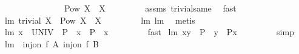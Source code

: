 \begin{isabellebody}
\ \ \ \ \ \ \ \ \ \ \ \ \ \ \ {\isachardoublequoteopen}{\isacharparenleft}Pow\ X\ {\isasymsubseteq}\ {\isacharbraceleft}{\isacharbraceleft}{\isacharbraceright}{\isacharcomma}X{\isacharbraceright}{\isacharparenright}{\isachardoublequoteclose}\ \isanewline
%
\isadelimproof
\ \ \ \ \ \ %
\endisadelimproof
%
\isatagproof
{}\isamarkupfalse%
\ assms\ trivial{\isacharunderscore}same\ \isamarkupfalse%
\ fast%
\endisatagproof
{\isafoldproof}%
%
\isadelimproof
\isanewline
%
\endisadelimproof
\isanewline
{}\isamarkupfalse%
\ lm{}{}{\isacharcolon}\ {\isachardoublequoteopen}trivial\ X\ {\isacharequal}\ {\isacharparenleft}Pow\ X\ {\isasymsubseteq}\ {\isacharbraceleft}{\isacharbraceleft}{\isacharbraceright}{\isacharcomma}X{\isacharbraceright}{\isacharparenright}{\isachardoublequoteclose}\ \isanewline
%
\isadelimproof
\ \ \ \ \ \ %
\endisadelimproof
%
\isatagproof
{}\isamarkupfalse%
\ lm{}{}\ lm{}{}\ \isamarkupfalse%
\ metis%
\endisatagproof
{\isafoldproof}%
%
\isadelimproof
\isanewline
%
\endisadelimproof
\isanewline
{}\isamarkupfalse%
\ lm{}{}{\isacharcolon}\ {\isachardoublequoteopen}{\isacharparenleft}{\isacharbraceleft}x{\isacharbraceright}\ {\isasymtimes}\ UNIV{\isacharparenright}\ {\isasyminter}\ P\ {\isacharequal}\ {\isacharbraceleft}x{\isacharbraceright}\ {\isasymtimes}\ {\isacharparenleft}P\ {\isacharbackquote}{\isacharbackquote}\ {\isacharbraceleft}x{\isacharbraceright}{\isacharparenright}{\isachardoublequoteclose}\ \isanewline
%
\isadelimproof
\ \ \ \ \ \ %
\endisadelimproof
%
\isatagproof
{}\isamarkupfalse%
\ fast%
\endisatagproof
{\isafoldproof}%
%
\isadelimproof
\isanewline
%
\endisadelimproof
\isanewline
{}\isamarkupfalse%
\ lm{}{}{\isacharcolon}\ {\isachardoublequoteopen}{\isacharparenleft}x{\isacharcomma}y{\isacharparenright}\ {\isasymin}\ P\ {\isacharequal}\ {\isacharparenleft}y\ {\isasymin}\ P{\isacharbackquote}{\isacharbackquote}{\isacharbraceleft}x{\isacharbraceright}{\isacharparenright}{\isachardoublequoteclose}\ \isanewline
%
\isadelimproof
\ \ \ \ \ \ %
\endisadelimproof
%
\isatagproof
{}\isamarkupfalse%
\ simp%
\endisatagproof
{\isafoldproof}%
%
\isadelimproof
\isanewline
%
\endisadelimproof
\isanewline
{}\isamarkupfalse%
\ lm{}{}{\isacharcolon}\ \ {\isachardoublequoteopen}inj{\isacharunderscore}on\ f\ A{\isachardoublequoteclose}\ {\isachardoublequoteopen}inj{\isacharunderscore}on\ f\ B{\isachardoublequoteclose}\ \isanewline

\end{isabellebody}
